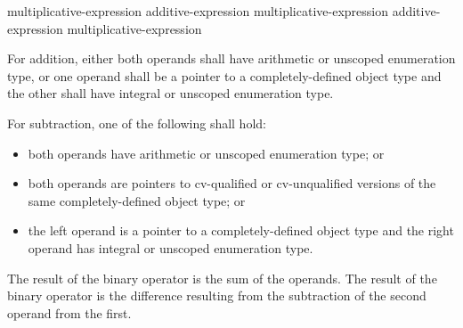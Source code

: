 %
%
%
%
%
%
%
\begin{bnf}
\br
    multiplicative-expression\br
    additive-expression \terminal{+} multiplicative-expression\br
    additive-expression \terminal{-} multiplicative-expression
\end{bnf}

%
For addition, either both operands shall have arithmetic or unscoped enumeration
type, or one operand shall be a pointer to a completely-defined object
type and the other shall have integral or unscoped enumeration type.

\pnum
For subtraction, one of the following shall hold:
\begin{itemize}
\item both operands have arithmetic or unscoped enumeration type; or

\item
{}%
both operands are pointers to cv-qualified or cv-unqualified
versions of the same completely-defined object type; or

\item the left operand is a pointer to a completely-defined object type
and the right operand has integral or unscoped enumeration type.
\end{itemize}

\pnum
The result of the binary \tcode{+} operator is the sum of the operands.
The result of the binary \tcode{-} operator is the difference resulting
from the subtraction of the second operand from the first.

